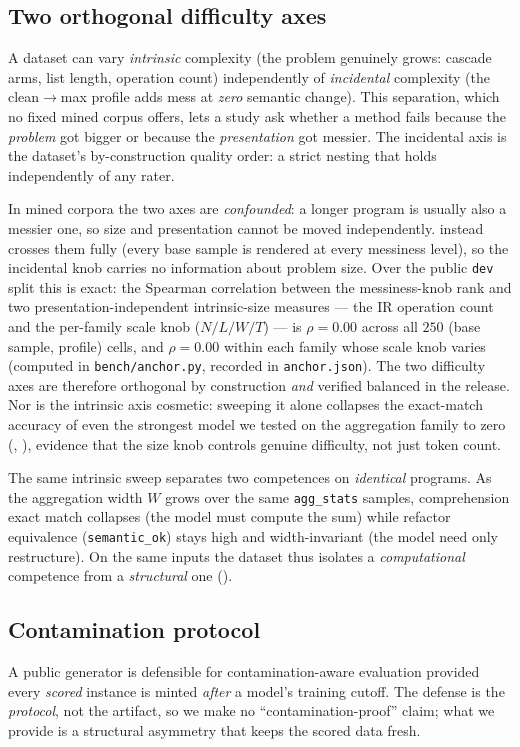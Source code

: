 \subsection{Two orthogonal difficulty axes}
\label{sec:axes}
A dataset can vary \emph{intrinsic} complexity (the problem genuinely grows: cascade
arms, list length, operation count) independently of \emph{incidental} complexity (the
\textsf{clean}$\rightarrow$\textsf{max} profile adds mess at \emph{zero} semantic change).
This separation, which no fixed mined corpus offers, lets a study ask whether a
method fails because the \emph{problem} got bigger or because the \emph{presentation} got
messier. The incidental axis is the dataset's by-construction quality order: a strict
nesting that holds independently of any rater.

In mined corpora the two axes
are \emph{confounded}: a longer program is usually also a messier one, so size and
presentation cannot be moved independently. \tool{} instead crosses them fully (every
base sample is rendered at every messiness level), so the incidental knob carries no
information about problem size. Over the public \texttt{dev} split this is exact: the
Spearman correlation between the messiness-knob rank and two presentation-independent
intrinsic-size measures --- the IR operation count and the per-family scale knob
($N/L/W/T$) --- is $\rho = 0.00$ across all $250$ (base sample, profile) cells, and
$\rho = 0.00$ within each family whose scale knob varies (computed in
\texttt{bench/anchor.py}, recorded in \texttt{anchor.json}). The two difficulty axes are
therefore orthogonal by construction \emph{and} verified balanced in the release. Nor
is the intrinsic axis cosmetic: sweeping it alone collapses the exact-match
accuracy of even the strongest model we tested on the aggregation family to zero
(, ), evidence that the size knob controls genuine
difficulty, not just token count.

The same intrinsic sweep separates two competences on \emph{identical}
programs. As the aggregation width $W$ grows over the same \texttt{agg\_stats} samples,
comprehension exact match collapses (the model must compute the sum) while refactor
equivalence (\texttt{semantic\_ok}) stays high and width-invariant (the model need only
restructure). On the same inputs the dataset thus isolates a \emph{computational}
competence from a \emph{structural} one ().

\subsection{Contamination protocol}
\label{sec:contam}
A public generator is defensible for contamination-aware evaluation provided every
\emph{scored} instance is minted \emph{after} a model's training cutoff. The defense is
the \emph{protocol}, not the artifact, so we make no ``contamination-proof'' claim; what
we provide is a structural asymmetry that keeps the scored data fresh.

